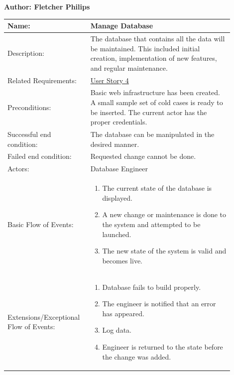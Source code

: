 \documentclass[11pt]{article}
\begin{document}
\begin{table}[!ht]
\begin{center}
\textbf{Author: Fletcher Philips}
\vspace*{1em}

\begin{tabular}{p{0.30\linewidth}p{0.60\linewidth}}
	Name: & Manage Database\\\hline
	Description: & The database that contains all the data will be maintained. This included initial creation, implementation of new features, and regular maintenance.\\\hline
	Related Requirements:& \hyperlink{us4}{User Story 4}\\\hline
	Preconditions:& Basic web infrastructure has been created. A small sample set of cold cases is ready to be inserted. The current actor has the proper credentials.\\\hline
	Successful end condition:& The database can be manipulated in the desired manner.\\\hline
	Failed end condition:& Requested change cannot be done.\\\hline
	Actors:& Database Engineer\\\hline
	Basic Flow of Events: & \begin{enumerate}
	\item The current state of the database is displayed.
	\item A new change or maintenance is done to the system and attempted to be launched.
	\item The new state of the system is valid and becomes live.
	\end{enumerate}\\\hline
	Extensions/Exceptional Flow of Events: & \begin{enumerate}
	\item Database fails to build properly.
	\item The engineer is notified that an error has appeared.
	\item Log data.
	\item Engineer is returned to the state before the change was added.
	\end{enumerate}
\end{tabular}
\label{des:create_database}	
\end{center}
\end{table}
\end{document}
